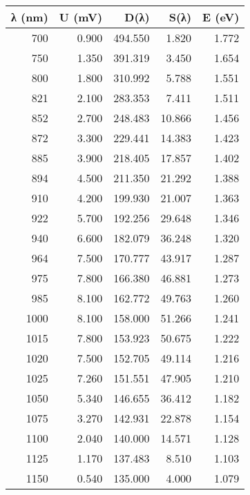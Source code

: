 \begin{tabular}{rrrrr}
\toprule
λ (nm) & U (mV) & D(λ) & S(λ) & E (eV) \\
\midrule
700 & 0.900 & 494.550 & 1.820 & 1.772 \\
750 & 1.350 & 391.319 & 3.450 & 1.654 \\
800 & 1.800 & 310.992 & 5.788 & 1.551 \\
821 & 2.100 & 283.353 & 7.411 & 1.511 \\
852 & 2.700 & 248.483 & 10.866 & 1.456 \\
872 & 3.300 & 229.441 & 14.383 & 1.423 \\
885 & 3.900 & 218.405 & 17.857 & 1.402 \\
894 & 4.500 & 211.350 & 21.292 & 1.388 \\
910 & 4.200 & 199.930 & 21.007 & 1.363 \\
922 & 5.700 & 192.256 & 29.648 & 1.346 \\
940 & 6.600 & 182.079 & 36.248 & 1.320 \\
964 & 7.500 & 170.777 & 43.917 & 1.287 \\
975 & 7.800 & 166.380 & 46.881 & 1.273 \\
985 & 8.100 & 162.772 & 49.763 & 1.260 \\
1000 & 8.100 & 158.000 & 51.266 & 1.241 \\
1015 & 7.800 & 153.923 & 50.675 & 1.222 \\
1020 & 7.500 & 152.705 & 49.114 & 1.216 \\
1025 & 7.260 & 151.551 & 47.905 & 1.210 \\
1050 & 5.340 & 146.655 & 36.412 & 1.182 \\
1075 & 3.270 & 142.931 & 22.878 & 1.154 \\
1100 & 2.040 & 140.000 & 14.571 & 1.128 \\
1125 & 1.170 & 137.483 & 8.510 & 1.103 \\
1150 & 0.540 & 135.000 & 4.000 & 1.079 \\
\bottomrule
\end{tabular}
